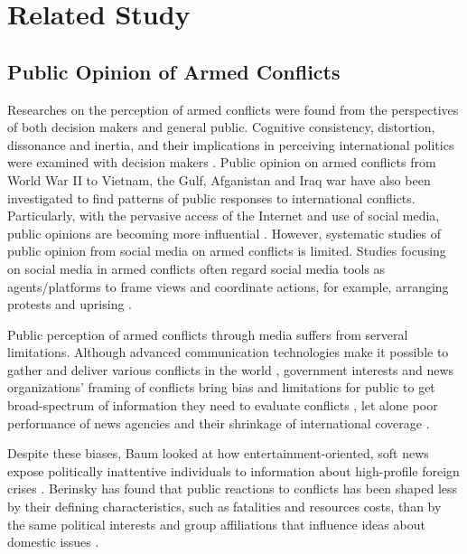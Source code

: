 \section{Related Study}
\subsection{Public Opinion of Armed Conflicts}
Researches on the perception of armed conflicts were found from the perspectives of both decision makers and general public. Cognitive consistency, distortion, dissonance and inertia, and their implications in perceiving international politics were examined with decision makers \cite{Jervis1976}. Public opinion on armed conflicts from World War II to Vietnam, the Gulf, Afganistan and Iraq war have also been investigated to find patterns of public responses to international conflicts. Particularly, with the pervasive access of the Internet and use of social media, public opinions are becoming more influential \cite{Shirky2011}. However, systematic studies of public opinion from social media on armed conflicts is limited. Studies focusing on social media in armed conflicts often regard social media tools as agents/platforms to frame views and coordinate actions, for example, arranging protests and uprising \cite{Lim2012}.

Public perception of armed conflicts through media suffers from serveral limitations. Although advanced communication technologies make it possible to gather and deliver various conflicts in the world \cite{Sacco2015}, government interests and news organizations' framing of conflicts bring bias and limitations for public to get broad-spectrum of information they need to evaluate conflicts \cite{Nelson1997}, let alone poor performance of news agencies and their shrinkage of international coverage \cite{Seib2004}. 

Despite these biases, Baum looked at how entertainment-oriented, soft news expose politically inattentive individuals to information about high-profile foreign crises \cite{Baum2002}. Berinsky has found that public reactions to conflicts has been shaped less by their defining characteristics, such as fatalities and resources costs, than by the same political interests and group affiliations that influence ideas about domestic issues \cite{Berinsky2009}.


